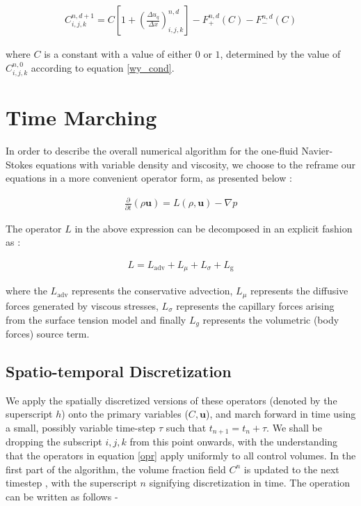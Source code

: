 \begin{align}
C_{i,j,k}^{n,d+1} =  C \left[1 + \left(\frac{\Delta u_q}{\Delta x}\right)^{n,d}_{i,j,k} \right] - F_{+}^{n,d}\left(C \right) - F_{-}^{n,d}\left(C \right)   
\label{wy_discrete}
\end{align}

where $C$ is a constant with a value of either $0$ or $1$, determined by the value of $C_{i,j,k}^{n,0}$ according to equation \ref{wy_cond}.  


\section{Time Marching}

In order to describe the overall numerical algorithm for the one-fluid Navier-Stokes equations with variable density and viscosity, we choose to the reframe our equations in a more convenient operator form, as presented below : 

\begin{align}
   \frac{\partial}{\partial t} \left( \rho \boldsymbol{u} \right) = L\left( \rho,\boldsymbol{u} \right) - \nabla p
\end{align}

The operator $L$ in the above expression can be decomposed in an explicit fashion as : 

\begin{align}
	L = L_{\textrm{adv}} + L_{\mu} + L_{\sigma} + L_{\textrm{g}} 
   \label{opr}
\end{align}

where the $L_{\textrm{adv}}$ represents the conservative advection, 
$L_{\mu}$ represents the diffusive forces generated by viscous stresses,
$L_{\sigma}$ represents the capillary forces arising from the surface tension model
and finally $L_{g}$ represents the volumetric (body forces) source term. 

\subsection*{Spatio-temporal Discretization}

We apply the spatially discretized versions of these operators (denoted by the superscript $h$) 
onto the primary variables ($C,\boldsymbol{u}$), and march forward in time using a small, 
possibly variable time-step $\tau$ such that $t_{n+1} = t_{n} + \tau$. 
We shall be dropping the subscript $i,j,k$ from this point onwards, with the understanding 
that the operators in equation \ref{opr} apply uniformly to all control volumes. 
In the first part of the algorithm, the volume fraction field $C^{n}$ is updated to the next timestep 
, with the superscript $n$ signifying discretization in time. The operation can be written as follows -       

